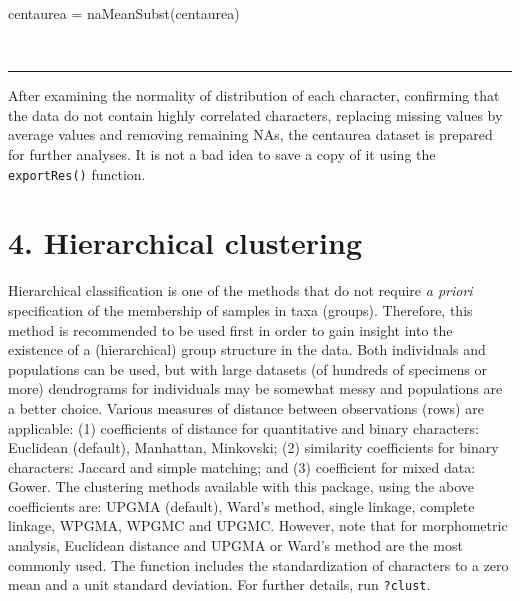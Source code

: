 \documentclass[
  11pt,
  a4paper]{article}
\newenvironment{Shaded}{\begin{snugshade}}{\end{snugshade}}
\newcommand{\FunctionTok}[1]{\textcolor[rgb]{0.00,0.00,0.00}{#1}}
\newcommand{\NormalTok}[1]{#1}
\newcommand{\OtherTok}[1]{\textcolor[rgb]{0.56,0.35,0.01}{#1}}
\begin{document}
\begin{Shaded}
\begin{Highlighting}[]
\NormalTok{centaurea }\OtherTok{=} \FunctionTok{naMeanSubst}\NormalTok{(centaurea)}
\end{Highlighting}
\end{Shaded}

~\\
\hspace*{0.333em}

\begin{center}\rule{0.5\linewidth}{0.5pt}\end{center}

After examining the normality of distribution of each character,
confirming that the data do not contain highly correlated characters,
replacing missing values by average values and removing remaining NAs,
the centaurea dataset is prepared for further analyses. It is not a bad
idea to save a copy of it using the \texttt{exportRes()} function.

\newpage

\hypertarget{hierarchical-clustering}{%
\section{4. Hierarchical clustering}\label{hierarchical-clustering}}

Hierarchical classification is one of the methods that do not require
\emph{a priori} specification of the membership of samples in taxa
(groups). Therefore, this method is recommended to be used first in
order to gain insight into the existence of a (hierarchical) group
structure in the data. Both individuals and populations can be used, but
with large datasets (of hundreds of specimens or more) dendrograms for
individuals may be somewhat messy and populations are a better choice.
Various measures of distance between observations (rows) are applicable:
(1) coefficients of distance for quantitative and binary characters:
Euclidean (default), Manhattan, Minkovski; (2) similarity coefficients
for binary characters: Jaccard and simple matching; and (3) coefficient
for mixed data: Gower. The clustering methods available with this
package, using the above coefficients are: UPGMA (default), Ward's
method, single linkage, complete linkage, WPGMA, WPGMC and UPGMC.
However, note that for morphometric analysis, Euclidean distance and
UPGMA or Ward's method are the most commonly used. The function includes
the standardization of characters to a zero mean and a unit standard
deviation. For further details, run \texttt{?clust}.
\end{document}
